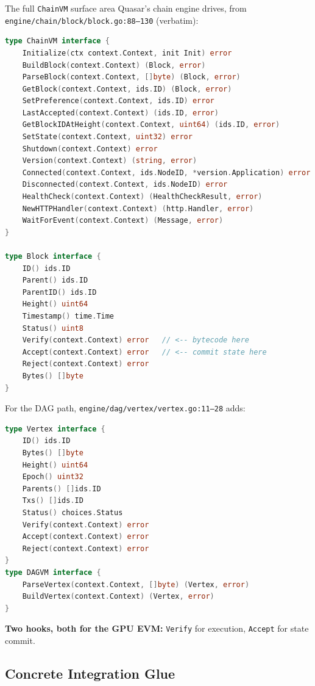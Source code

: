 The full \texttt{ChainVM} surface area Quasar's chain engine drives, from
\texttt{engine/chain/block/block.go:88--130} (verbatim):

\begin{lstlisting}[basicstyle=\ttfamily\footnotesize, language=go]
type ChainVM interface {
    Initialize(ctx context.Context, init Init) error
    BuildBlock(context.Context) (Block, error)
    ParseBlock(context.Context, []byte) (Block, error)
    GetBlock(context.Context, ids.ID) (Block, error)
    SetPreference(context.Context, ids.ID) error
    LastAccepted(context.Context) (ids.ID, error)
    GetBlockIDAtHeight(context.Context, uint64) (ids.ID, error)
    SetState(context.Context, uint32) error
    Shutdown(context.Context) error
    Version(context.Context) (string, error)
    Connected(context.Context, ids.NodeID, *version.Application) error
    Disconnected(context.Context, ids.NodeID) error
    HealthCheck(context.Context) (HealthCheckResult, error)
    NewHTTPHandler(context.Context) (http.Handler, error)
    WaitForEvent(context.Context) (Message, error)
}

type Block interface {
    ID() ids.ID
    Parent() ids.ID
    ParentID() ids.ID
    Height() uint64
    Timestamp() time.Time
    Status() uint8
    Verify(context.Context) error   // <-- bytecode here
    Accept(context.Context) error   // <-- commit state here
    Reject(context.Context) error
    Bytes() []byte
}
\end{lstlisting}

For the DAG path, \texttt{engine/dag/vertex/vertex.go:11--28} adds:

\begin{lstlisting}[basicstyle=\ttfamily\footnotesize, language=go]
type Vertex interface {
    ID() ids.ID
    Bytes() []byte
    Height() uint64
    Epoch() uint32
    Parents() []ids.ID
    Txs() []ids.ID
    Status() choices.Status
    Verify(context.Context) error
    Accept(context.Context) error
    Reject(context.Context) error
}
type DAGVM interface {
    ParseVertex(context.Context, []byte) (Vertex, error)
    BuildVertex(context.Context) (Vertex, error)
}
\end{lstlisting}

\textbf{Two hooks, both for the GPU EVM:} \texttt{Verify} for execution,
\texttt{Accept} for state commit.

\subsection{Concrete Integration Glue}
\label{sec:cevm-glue}

